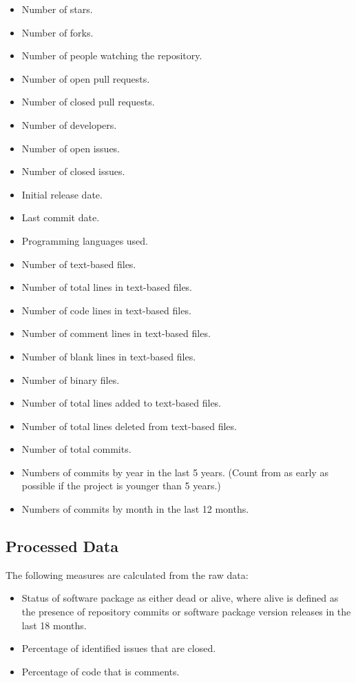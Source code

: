 \documentclass[letterpaper,cleveref]{lipics-v2019}
\begin{document}
\begin{itemize}
\item Number of stars.
\item Number of forks.
\item Number of people watching the repository.
\item Number of open pull requests.
\item Number of closed pull requests.	
\item Number of developers.	
\item Number of open issues.
\item Number of closed issues.
\item Initial release date.
\item Last commit date.
\item Programming languages used.
\item Number of text-based files.
\item Number of total lines in text-based files.
\item Number of code lines in text-based files.
\item Number of comment lines in text-based files.
\item Number of blank lines in text-based files.
\item Number of binary files.  
\item Number of total lines added to text-based files.
\item Number of total lines deleted from text-based files.
\item Number of total commits.
\item Numbers of commits by year in the last 5 years. (Count from as early as
  possible if the project is younger than 5 years.)
\item Numbers of commits by month in the last 12 months.
\end{itemize}

\subsection{Processed Data}\label{processeddata}

The following measures are calculated from the raw data:

\begin{itemize}
\item Status of software package as either dead or alive, where alive is defined
  as the presence of repository commits or software package version releases in
  the last 18 months.
\item Percentage of identified issues that are closed.
\item Percentage of code that is comments.
\end{itemize}
\end{document}

